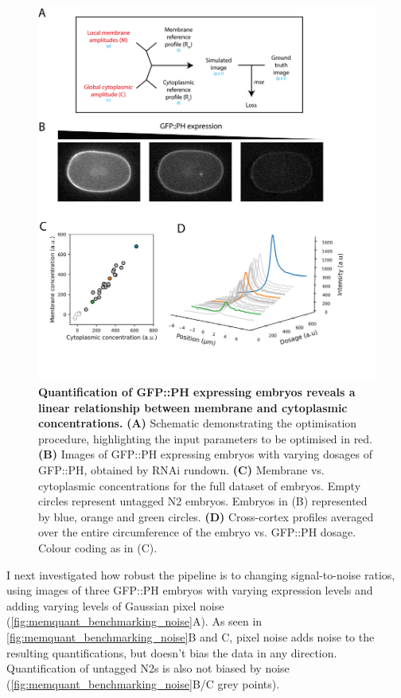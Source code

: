 \documentclass[12pt]{"report"}
\newcommand{\mycaption}[2]{\caption[#1]{\textbf{#1.} #2}}
\begin{document}
\begin{figure}
\includegraphics[scale=1]{memquant_benchmarking_ph_rundown}
\centering
\mycaption{Quantification of GFP::PH expressing embryos reveals a linear relationship between membrane and cytoplasmic concentrations}{
\textbf{(A)} Schematic demonstrating the optimisation procedure, highlighting the input parameters to be optimised in red.
\textbf{(B)} Images of GFP::PH expressing embryos with varying dosages of GFP::PH, obtained by RNAi rundown.
\textbf{(C)} Membrane vs. cytoplasmic concentrations for the full dataset of embryos. Empty circles represent untagged N2 embryos. Embryos in (B) represented by blue, orange and green circles.
\textbf{(D)} Cross-cortex profiles averaged over the entire circumference of the embryo vs. GFP::PH dosage. Colour coding as in (C).
}
\label{fig:memquant_benchmarking_ph_rundown}
\end{figure}

I next investigated how robust the pipeline is to changing signal-to-noise ratios, using images of three GFP::PH embryos with varying expression levels and adding varying levels of Gaussian pixel noise (\cref{fig:memquant_benchmarking_noise}A). As seen in \cref{fig:memquant_benchmarking_noise}B and C, pixel noise adds noise to the resulting quantifications, but doesn't bias the data in any direction. Quantification of untagged N2s is also not biased by noise (\cref{fig:memquant_benchmarking_noise}B/C grey points).\\
\end{document}
